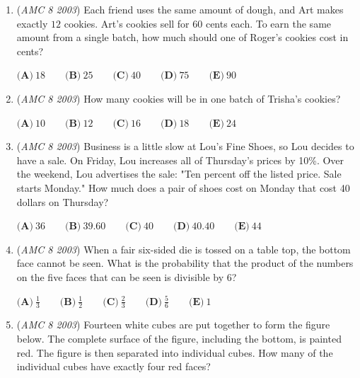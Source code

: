 \begin{enumerate}
 Each friend uses the same amount of dough, and Art makes exactly 12 cookies. Who gets the fewest cookies from one batch of cookie dough?


 $\textbf{(A)}\ \text{Art}\qquad\textbf{(B)}\ \text{Roger}\qquad\textbf{(C)}\ \text{Paul}\qquad\textbf{(D)}\ \text{Trisha}\qquad\textbf{(E)}\ \text{There is a tie for fewest.}$


	\item (\textit{AMC 8 2003}) Each friend uses the same amount of dough, and Art makes exactly $12$ cookies. Art's cookies sell for $60$ cents each. To earn the same amount from a single batch, how much should one of Roger's cookies cost in cents?


 $\textbf{(A)}\ 18\qquad\textbf{(B)}\ 25\qquad\textbf{(C)}\ 40\qquad\textbf{(D)}\ 75\qquad\textbf{(E)}\ 90$


	\item (\textit{AMC 8 2003}) How many cookies will be in one batch of Trisha's cookies?


 $\textbf{(A)}\ 10\qquad\textbf{(B)}\ 12\qquad\textbf{(C)}\ 16\qquad\textbf{(D)}\ 18\qquad\textbf{(E)}\ 24$


	\item (\textit{AMC 8 2003}) Business is a little slow at Lou's Fine Shoes, so Lou decides to have a sale. On Friday, Lou increases all of Thursday's prices by 10\%. Over the weekend, Lou advertises the sale: "Ten percent off the listed price. Sale starts Monday." How much does a pair of shoes cost on Monday that cost 40 dollars on Thursday?


 $\textbf{(A)}\ 36\qquad\textbf{(B)}\ 39.60\qquad\textbf{(C)}\ 40\qquad\textbf{(D)}\ 40.40\qquad\textbf{(E)}\ 44$


	\item (\textit{AMC 8 2003}) When a fair six-sided die is tossed on a table top, the bottom face cannot be seen. What is the probability that the product of the numbers on the five faces that can be seen is divisible by 6?


 $\textbf{(A)}\ \frac{1}{3}\qquad\textbf{(B)}\ \frac{1}{2}\qquad\textbf{(C)}\ \frac{2}{3}\qquad\textbf{(D)}\ \frac{5}{6}\qquad\textbf{(E)}\ 1$


	\item (\textit{AMC 8 2003}) Fourteen white cubes are put together to form the figure below. The complete surface of the figure, including the bottom, is painted red. The figure is then separated into individual cubes. How many of the individual cubes have exactly four red faces?



\end{enumerate}
